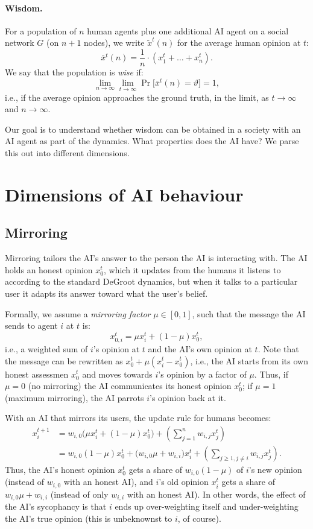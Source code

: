 \documentclass{scrartcl}
\theoremstyle{definition}
\renewcommand{\theta}{\vartheta}
\begin{document}
\paragraph{Wisdom.}
For a population of $n$ human agents plus one additional AI agent on a social network $G$ 
(on $n+1$ nodes),
we write $\tilde x^t(n)$ for the average human opinion at $t$:
$$
    \bar x^t(n) = \frac{1}{n} \cdot \left(x_1^t + \dots + x_n^t\right).
$$
We say that the population is \emph{wise} if:
$$
    \lim_{n \rightarrow \infty}\lim_{t \rightarrow \infty} {\Pr}\Big[ \bar x^t(n) = \theta \Big] = 1,
$$
i.e., if the average opinion approaches the ground truth, in the limit,
as $t \rightarrow \infty$ and $n \rightarrow \infty$.

Our goal is to understand whether wisdom can be obtained 
in a society with an AI agent as part of the dynamics. 
What properties does the AI have?
We parse this out into different dimensions.


\section{Dimensions of AI behaviour}\label{sec:dimensions}
\subsection{Mirroring}
Mirroring tailors the AI's answer to the person the AI is interacting with. 
The AI holds an honest opinion $x_0^t$, which it updates from the humans it 
listens to according to the standard DeGroot dynamics, 
but when it talks to a particular user it adapts its answer 
toward what the user's belief. 

Formally, we assume a \emph{mirroring factor} $\mu \in [0, 1]$,
such that the message the AI sends to agent $i$ at $t$ is:  
$$
    x^t_{0, i} = \mu x_i^t + (1-\mu)x_0^t,
$$
i.e., a weighted sum of $i$'s opinion at $t$ and the AI's own 
opinion at $t$. Note that the message can be rewritten as 
$x_0^t + \mu(x_i^t - x_0^t)$, i.e., the AI starts from 
its own honest assessmen $x_0^t$ and moves towards $i$'s
opinion by a factor of $\mu$. Thus, if $\mu = 0$
(no mirroring) the AI communicates its honest opinion $x_0^t$; 
if $\mu = 1$ (maximum mirroring), the AI parrots $i$'s 
opinion back at it.

With an AI that mirrors its users, the update rule for humans becomes:
\begin{align*}
    x_i^{t+1} &= 
    w_{i,0} \Big(\mu x_i^t + 
        (1-\mu)x_0^t \Big) + 
        \left(\sum_{j = 1}^n w_{i, j} x_j^t \right) \\
    & = w_{i, 0}(1-\mu)x_0^t + 
        \big(w_{i, 0}\mu + w_{i, i}\big)x_i^t + 
        \left(\sum_{j \geq 1, j \neq i} w_{i, j}x_j^t\right).
\end{align*}
Thus, the AI's honest opinion $x_0^t$ gets a share of $w_{i,0}(1-\mu)$ 
of $i$'s new opinion (instead of $w_{i, 0}$ with an honest AI),
and $i$'s old opinion $x_i^t$ gets a share of $w_{i, 0} \mu + w_{i, i}$
(instead of only $w_{i, i}$ with an honest AI).
In other words, the effect of the AI's sycophancy is that 
$i$ ends up over-weighting itself and under-weighting the AI's
true opinion (this is unbeknownst to $i$, of course).
\end{document}
